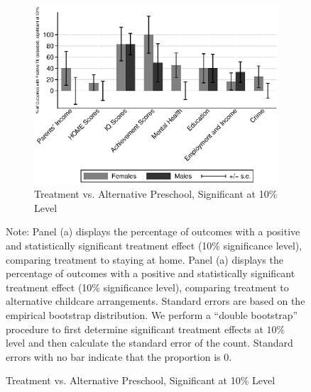 \begin{figure}[H]
\begin{subfigure}[h]{0.7\textwidth}
	\centering
	\caption{Treatment vs. Alternative Preschool, Significant at 10\% Level}
		\includegraphics[width=\textwidth]{output/epan_ipw_p1_cats1_sig10.eps}
\end{subfigure}
\scriptsize \justify
Note: Panel (a) displays the percentage of outcomes with a positive and statistically significant treatment effect (10\% significance level), comparing treatment to staying at home. Panel (a) displays the percentage of outcomes with a positive and statistically significant treatment effect (10\% significance level), comparing treatment to alternative childcare arrangements. Standard errors are based on the empirical bootstrap distribution. We perform a ``double bootstrap'' procedure to first determine significant treatment effects at $10\%$ level and then calculate the standard error of the count. Standard errors with no bar indicate that the proportion is 0. \\
\end{figure}

